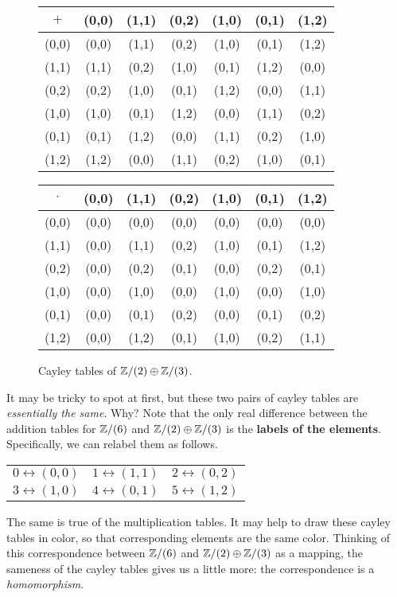 \begin{figure}[h!]
\begin{center}
\begin{tabular}{c|cccccc}
\(+\) & (0,0) & (1,1) & (0,2) & (1,0) & (0,1) & (1,2) \\ \hline
(0,0) & (0,0) & (1,1) & (0,2) & (1,0) & (0,1) & (1,2) \\
(1,1) & (1,1) & (0,2) & (1,0) & (0,1) & (1,2) & (0,0) \\
(0,2) & (0,2) & (1,0) & (0,1) & (1,2) & (0,0) & (1,1) \\
(1,0) & (1,0) & (0,1) & (1,2) & (0,0) & (1,1) & (0,2) \\
(0,1) & (0,1) & (1,2) & (0,0) & (1,1) & (0,2) & (1,0) \\
(1,2) & (1,2) & (0,0) & (1,1) & (0,2) & (1,0) & (0,1)
\end{tabular}

\vspace{0.5cm}

\begin{tabular}{c|cccccc}
\(\cdot\) & (0,0) & (1,1) & (0,2) & (1,0) & (0,1) & (1,2) \\ \hline
(0,0)     & (0,0) & (0,0) & (0,0) & (0,0) & (0,0) & (0,0) \\
(1,1)     & (0,0) & (1,1) & (0,2) & (1,0) & (0,1) & (1,2) \\
(0,2)     & (0,0) & (0,2) & (0,1) & (0,0) & (0,2) & (0,1) \\
(1,0)     & (0,0) & (1,0) & (0,0) & (1,0) & (0,0) & (1,0) \\
(0,1)     & (0,0) & (0,1) & (0,2) & (0,0) & (0,1) & (0,2) \\
(1,2)     & (0,0) & (1,2) & (0,1) & (1,0) & (0,2) & (1,1) \\
\end{tabular}
\caption{Cayley tables of \(\mathbb{Z}/(2) \oplus \mathbb{Z}/(3)\). \label{fig:cayley-zz2-zz3}}
\end{center}
\end{figure}
It may be tricky to spot at first, but these two pairs of cayley tables are \emph{essentially the same}. Why? Note that the only real difference between the addition tables for \(\mathbb{Z}/(6)\) and \(\mathbb{Z}/(2) \oplus \mathbb{Z}/(3)\) is the \textbf{labels of the elements}. Specifically, we can relabel them as follows.
\begin{center}
\begin{tabular}{ccc}
\(0 \leftrightarrow (0,0)\) & \(1 \leftrightarrow (1,1)\) & \(2 \leftrightarrow (0,2)\) \\
\(3 \leftrightarrow (1,0)\) & \(4 \leftrightarrow (0,1)\) & \(5 \leftrightarrow (1,2)\)
\end{tabular}
\end{center}
The same is true of the multiplication tables. It may help to draw these cayley tables in color, so that corresponding elements are the same color. Thinking of this correspondence between \(\mathbb{Z}/(6)\) and \(\mathbb{Z}/(2) \oplus \mathbb{Z}/(3)\) as a mapping, the sameness of the cayley tables gives us a little more: the correspondence is a \emph{homomorphism}.

